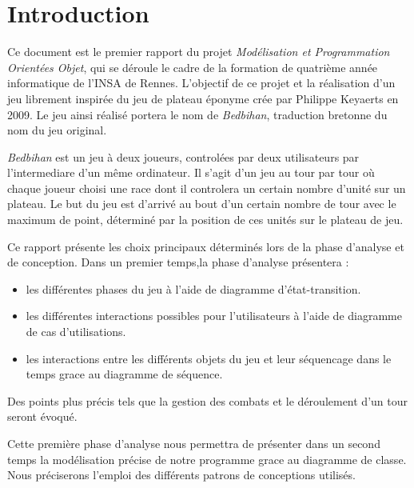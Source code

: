 \section{Introduction}
	
	Ce document est le premier rapport du projet \emph{Modélisation et Programmation Orientées Objet}, qui se déroule le cadre de la formation de quatrième année informatique de l'INSA de Rennes. L'objectif de ce projet et la réalisation d'un jeu librement inspirée du jeu de plateau éponyme crée par Philippe Keyaerts en 2009. Le jeu ainsi réalisé portera le nom de \emph{Bedbihan}, traduction bretonne du nom du jeu original. 

	\emph{Bedbihan} est un jeu à deux joueurs, controlées par deux utilisateurs par l'intermediare d'un même ordinateur. Il s'agit d'un jeu au tour par tour où chaque joueur choisi une race dont il controlera un certain nombre d'unité sur un plateau. Le but du jeu est d'arrivé au bout d'un certain nombre de tour avec le maximum de point, déterminé par la position de ces unités sur le plateau de jeu. 

	Ce rapport présente les choix principaux déterminés lors de la phase d'analyse et de conception. Dans un premier temps,la phase d'analyse présentera :
	\begin{itemize}
		\item les différentes phases du jeu à l'aide de diagramme d'état-transition.
		\item les différentes interactions possibles pour l'utilisateurs à l'aide de diagramme de cas d'utilisations.
		\item les interactions entre les différents objets du jeu et leur séquencage dans le temps grace au diagramme de séquence.  
	\end{itemize}

	Des points plus précis tels que la gestion des combats et le déroulement d'un tour seront évoqué. 

	Cette première phase d'analyse nous permettra de présenter dans un second temps la modélisation précise de notre programme grace au diagramme de classe. Nous préciserons l'emploi des différents patrons de conceptions utilisés.



















